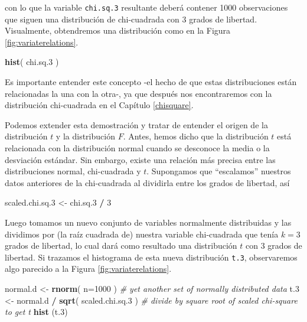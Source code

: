 \documentclass[spanish,]{book}
\newenvironment{Shaded}{\begin{snugshade}}{\end{snugshade}}
\newcommand{\KeywordTok}[1]{\textcolor[rgb]{0.13,0.29,0.53}{\textbf{#1}}}
\newcommand{\DataTypeTok}[1]{\textcolor[rgb]{0.13,0.29,0.53}{#1}}
\newcommand{\DecValTok}[1]{\textcolor[rgb]{0.00,0.00,0.81}{#1}}
\newcommand{\StringTok}[1]{\textcolor[rgb]{0.31,0.60,0.02}{#1}}
\newcommand{\CommentTok}[1]{\textcolor[rgb]{0.56,0.35,0.01}{\textit{#1}}}
\newcommand{\OperatorTok}[1]{\textcolor[rgb]{0.81,0.36,0.00}{\textbf{#1}}}
\newcommand{\NormalTok}[1]{#1}
\begin{document}
con lo que la variable \texttt{chi.sq.3} resultante deberá contener 1000
observaciones que siguen una distribución de chi-cuadrada con 3 grados
de libertad. Visualmente, obtendremos una distribución como en la Figura
\ref{fig:variaterelations}.

\begin{Shaded}
\begin{Highlighting}[]
\KeywordTok{hist}\NormalTok{( chi.sq.}\DecValTok{3}\NormalTok{ )  }
\end{Highlighting}
\end{Shaded}

Es importante entender este concepto -el hecho de que estas
distribuciones están relacionadas la una con la otra-, ya que después
nos encontraremos con la distribución chi-cuadrada en el Capítulo
\ref{chisquare}.

Podemos extender esta demostración y tratar de entender el origen de la
distribución \(t\) y la distribución \(F\). Antes, hemos dicho que la
distribución \(t\) está relacionada con la distribución normal cuando se
desconoce la media o la desviación estándar. Sin embargo, existe una
relación más precisa entre las distribuciones normal, chi-cuadrada y
\(t\). Supongamos que ``escalamos'' nuestros datos anteriores de la
chi-cuadrada al dividirla entre los grados de libertad, así

\begin{Shaded}
\begin{Highlighting}[]
\NormalTok{scaled.chi.sq.}\DecValTok{3}\NormalTok{ <-}\StringTok{ }\NormalTok{chi.sq.}\DecValTok{3} \OperatorTok{/}\StringTok{ }\DecValTok{3}
\end{Highlighting}
\end{Shaded}

Luego tomamos un nuevo conjunto de variables normalmente distribuidas y
las dividimos por (la raíz cuadrada de) nuestra variable chi-cuadrada
que tenía \(k=3\) grados de libertad, lo cual dará como resultado una
distribución \(t\) con 3 grados de libertad. Si trazamos el histograma
de esta nueva distribución \texttt{t.3}, observaremos algo parecido a la
Figura \ref{fig:variaterelations}.

\begin{Shaded}
\begin{Highlighting}[]
\NormalTok{normal.d <-}\StringTok{ }\KeywordTok{rnorm}\NormalTok{( }\DataTypeTok{n=}\DecValTok{1000}\NormalTok{ )                }\CommentTok{# yet another set of normally distributed data}
\NormalTok{t.}\DecValTok{3}\NormalTok{ <-}\StringTok{ }\NormalTok{normal.d }\OperatorTok{/}\StringTok{ }\KeywordTok{sqrt}\NormalTok{( scaled.chi.sq.}\DecValTok{3}\NormalTok{ )  }\CommentTok{# divide by square root of scaled chi-square to get t}
\KeywordTok{hist}\NormalTok{ (t.}\DecValTok{3}\NormalTok{)}
\end{Highlighting}
\end{Shaded}
\end{document}
